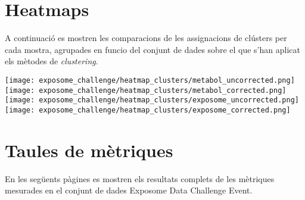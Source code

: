 \documentclass[CAT,BIB]{TFUOC}%
\begin{document}
%
%
%
    \section{Heatmaps}

        A continuació es mostren les comparacions
        de les assignacions de clústers per cada mostra,
        agrupades en funcio del conjunt de dades
        sobre el que s'han aplicat els mètodes de \textit{clustering}.

        \texttt{[image: exposome\_challenge/heatmap\_clusters/metabol\_uncorrected.png]}
        \texttt{[image: exposome\_challenge/heatmap\_clusters/metabol\_corrected.png]}
        \texttt{[image: exposome\_challenge/heatmap\_clusters/exposome\_uncorrected.png]}
        \texttt{[image: exposome\_challenge/heatmap\_clusters/exposome\_corrected.png]}


    \section{Taules de mètriques}

    En les següents pàgines es mostren els resultats complets
    de les mètriques mesurades en el conjunt de dades
    Exposome Data Challenge Event.
\end{document}
